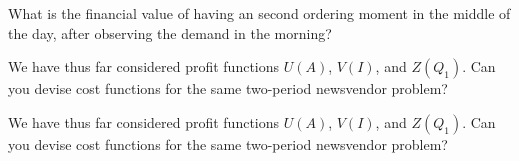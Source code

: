 \begin{exercise}
What is the financial value of having an second ordering moment in the middle of the day, after observing the demand in the morning?

\end{exercise}

\begin{exercise}
We have thus far considered profit functions $U(A)$, $V(I)$, and $Z(Q_1)$. Can you devise cost functions for the same two-period newsvendor problem?

\end{exercise}

\begin{exercise}
We have thus far considered profit functions $U(A)$, $V(I)$, and $Z(Q_1)$. Can you devise cost functions for the same two-period newsvendor problem?

\end{exercise}

